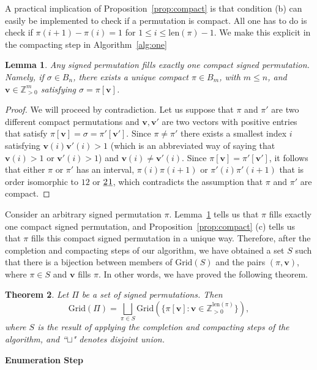 \documentclass{article}
\numberwithin{equation}{section}
\newtheorem{thm}{Theorem}[section]
\newtheorem{lem}[thm]{Lemma}
\theoremstyle{definition}
\newcommand{\V}{\textbf{v}}
\newcommand{\Grid}{\text{Grid}}
\newcommand{\len}{\text{len}}
\begin{document}
A practical implication of Proposition~\ref{prop:compact} is that condition (b) can easily be implemented to check if a permutation is compact.  All one has to do is check if $\pi(i+1)-\pi(i) = 1$ for $1\leq i\leq \len(\pi)-1$.  We make this explicit in the compacting step in Algorithm~\ref{alg:one} 

\begin{lem}\label{lem:unique}
Any signed permutation fills exactly one compact signed permutation. Namely, if $\sigma\in B_n$, there exists a unique compact $\pi\in B_m$, with $m\leq n$, and $\V\in\mathbb{Z}^m_{>0}$ satisfying $\sigma=\pi[\V]$.
\end{lem}
\begin{proof}
We will proceed by contradiction. Let us suppose that $\pi$ and $\pi'$ are two different compact permutations and $\V,\V'$ are two vectors with positive entries that satisfy $\pi[\V]=\sigma=\pi'[\V']$. Since $\pi\neq\pi'$ there exists a smallest index $i$ satisfying $\V(i)\V'(i)>1$ (which is an abbreviated way of saying that $\V(i)>1$ or $\V'(i)>1$) and $\V(i)\neq\V'(i)$. Since $\pi[\V]=\pi'[\V']$, it follows that either $\pi$ or $\pi'$ has an interval, $\pi(i)\pi(i+1)$ or $\pi'(i)\pi'(i+1)$ that is order isomorphic to $12$ or $\underline{2}\hspace{0.02cm}\underline{1}$, which contradicts the assumption that $\pi$ and $\pi'$ are compact. 
\end{proof}

Consider an arbitrary signed permutation $\pi$.  Lemma~\ref{lem:unique} tells us that $\pi$ fills exactly one compact signed permutation, and Proposition~\ref{prop:compact} (c) tells us that $\pi$ fills this compact signed permutation in a unique way.  Therefore, after the completion and compacting steps of our algorithm, we have obtained a set $S$ such that there is a bijection between members of $\Grid(S)$ and the pairs $(\pi, \V)$, where $\pi\in S$ and $\V$ fills $\pi$. In other words, we have proved the following theorem.

\begin{thm}
Let $\Pi$ be a set of signed permutations. Then
\[
\Grid(\Pi)=\bigsqcup_{\pi\in S}\Grid(\{\pi[\V]:\V\in\mathbb{Z}_{>0}^{\len(\pi)}\}),
\] where $S$ is the result of applying the completion and compacting steps of the algorithm, and ``$\sqcup$" denotes disjoint union.
\end{thm}


\vspace{5mm}
\noindent \textbf{\large Enumeration Step}
\end{document}
